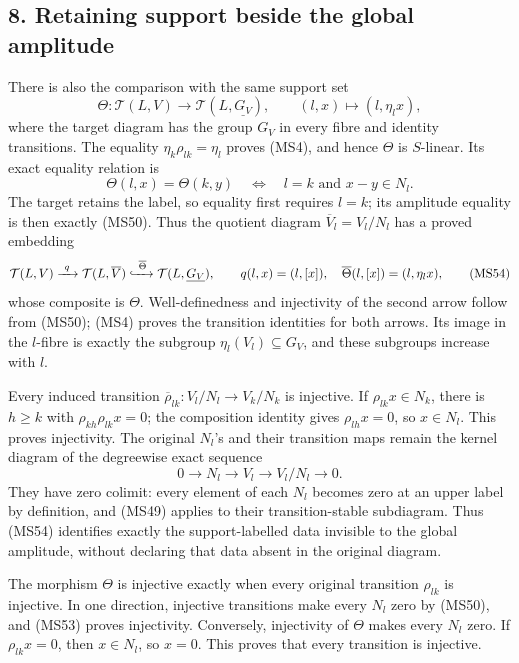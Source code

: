 \documentclass[
]{article}
\begin{document}
\subsection{8. Retaining support beside the global
amplitude}\label{retaining-support-beside-the-global-amplitude}

There is also the comparison with the same support set \[
\Theta:\mathcal T(L,V)\longrightarrow\mathcal T(L,\underline{G_V}),
\qquad (l,x)\longmapsto(l,\eta_lx),
\tag{MS52}
\] where the target diagram has the group \(G_V\) in every fibre and
identity transitions. The equality \(\eta_k\rho_{lk}=\eta_l\) proves
(MS4), and hence \(\Theta\) is \(S\)-linear. Its exact equality relation
is \[
\Theta(l,x)=\Theta(k,y)
\quad\Longleftrightarrow\quad
l=k\text{ and }x-y\in N_l.
\tag{MS53}
\] The target retains the label, so equality first requires \(l=k\); its
amplitude equality is then exactly (MS50). Thus the quotient diagram
\(\overline V_l=V_l/N_l\) has a proved embedding \[
\mathcal T(L,V)\xrightarrow{\ q\ }
\mathcal T(L,\overline V)
\xhookrightarrow{\ \overline\Theta\ }
\mathcal T(L,\underline{G_V}),
\qquad
q(l,x)=(l,[x]),\quad\overline\Theta(l,[x])=(l,\eta_lx),
\tag{MS54}
\] whose composite is \(\Theta\). Well-definedness and injectivity of
the second arrow follow from (MS50); (MS4) proves the transition
identities for both arrows. Its image in the \(l\)-fibre is exactly the
subgroup \(\eta_l(V_l)\subseteq G_V\), and these subgroups increase with
\(l\).

Every induced transition \(\overline\rho_{lk}:V_l/N_l\to V_k/N_k\) is
injective. If \(\rho_{lk}x\in N_k\), there is \(h\ge k\) with
\(\rho_{kh}\rho_{lk}x=0\); the composition identity gives
\(\rho_{lh}x=0\), so \(x\in N_l\). This proves injectivity. The original
\(N_l\)'s and their transition maps remain the kernel diagram of the
degreewise exact sequence \[
0\longrightarrow N_l\longrightarrow V_l\longrightarrow V_l/N_l\longrightarrow0.
\tag{MS55}
\] They have zero colimit: every element of each \(N_l\) becomes zero at
an upper label by definition, and (MS49) applies to their
transition-stable subdiagram. Thus (MS54) identifies exactly the
support-labelled data invisible to the global amplitude, without
declaring that data absent in the original diagram.

The morphism \(\Theta\) is injective exactly when every original
transition \(\rho_{lk}\) is injective. In one direction, injective
transitions make every \(N_l\) zero by (MS50), and (MS53) proves
injectivity. Conversely, injectivity of \(\Theta\) makes every \(N_l\)
zero. If \(\rho_{lk}x=0\), then \(x\in N_l\), so \(x=0\). This proves
that every transition is injective.
\end{document}

